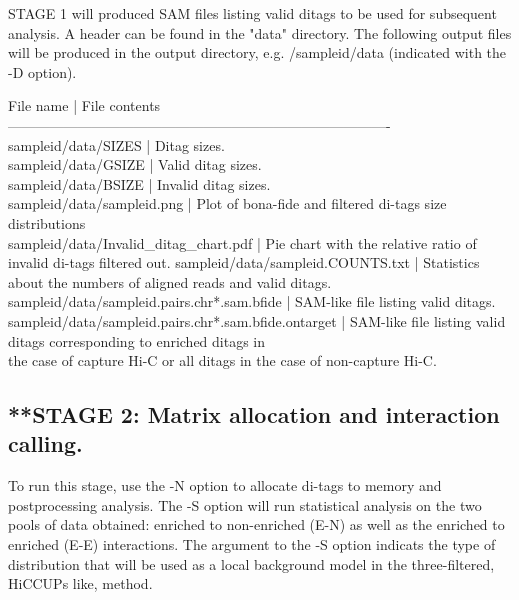 \documentclass[10pt,a4paper]{article}
\begin{document}
STAGE 1 will produced SAM files listing valid ditags to be used for subsequent analysis.  A header can be found in the "data" directory.
The following output files will be produced in the output directory, e.g. /sampleid/data (indicated with the -D option).

File name                                                         |  File contents\\
----------------------------------------------------------------------------------\\
sampleid/data/SIZES                                     |  Ditag sizes.\\
sampleid/data/GSIZE                                     |  Valid ditag sizes.\\
sampleid/data/BSIZE                                     |  Invalid ditag sizes.\\
sampleid/data/sampleid.png                            |  Plot of bona-fide and filtered di-tags size distributions \\
sampleid/data/Invalid\_ditag\_chart.pdf                 |  Pie chart with the relative ratio of invalid di-tags filtered out.
sampleid/data/sampleid.COUNTS.txt                     |  Statistics about the numbers of aligned reads and valid ditags.\\
sampleid/data/sampleid.pairs.chr*.sam.bfide           |  SAM-like file listing valid ditags.\\
sampleid/data/sampleid.pairs.chr*.sam.bfide.ontarget  |  SAM-like file listing valid ditags corresponding to enriched ditags in \\
                                                                     the case of capture Hi-C or all ditags in the case of non-capture Hi-C.\\

\subsection{**STAGE 2: Matrix allocation and interaction calling.}

To run this stage, use the -N option to allocate di-tags to memory and postprocessing analysis.
The -S option will run statistical analysis on the two pools of data obtained: enriched to non-enriched (E-N) as well as the enriched to enriched (E-E) interactions.
The argument to the -S option indicats the type of distribution that will be used as a local background model in the three-filtered, HiCCUPs like, method.  
\end{document}
